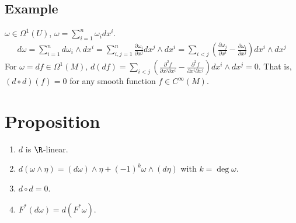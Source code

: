 \documentclass[11pt]{article}
\begin{document}
\subsection*{Example}
\label{sec:orgf47466e}
\(\omega\in\Omega^{1}(U)\), \(\omega=\sum_{i=1}^{n}\omega_{i}dx^{i}\).\\
\begin{align*}
  d\omega
  =\sum_{i=1}^{n}d\omega_{i}\wedge dx^{i}
  =\sum_{i,j=1}^{n}\frac{\partial\omega_{i}}{\partial x^{j}}dx^{j}\wedge dx^{i}
  =\sum_{i< j}\left( \frac{\partial\omega_{j}}{\partial x^{i}}-\frac{\partial\omega_{i}}{\partial x^{j}} \right) dx^{i}\wedge dx^{j}
\end{align*}
For \(\omega=df\in\Omega^{1}(M)\), \(d(df)=\sum_{i<j}\left( \frac{\partial^{2}f}{\partial x^{j}\partial x^{i}}-\frac{\partial^{2}f}{\partial x^{i}\partial x^{j}} \right)dx^{i}\wedge dx^{j}=0\). That is, \((d\circ d)(f)=0\) for any smooth function \(f\in C^{\infty}(M)\).\\
\section*{Proposition}
\label{sec:org43f1ecc}
\begin{enumerate}
\item \(d\) is \(\R\)-linear.\\
\item \(d(\omega\wedge\eta)=(d\omega)\wedge\eta+(-1)^{k}\omega\wedge(d\eta)\) with \(k=\operatorname{deg}\omega\).\\
\item \(d\circ d=0\).\\
\item \(F^{*}(d\omega)=d(F^{*}\omega)\).\\
\end{enumerate}
\end{document}
